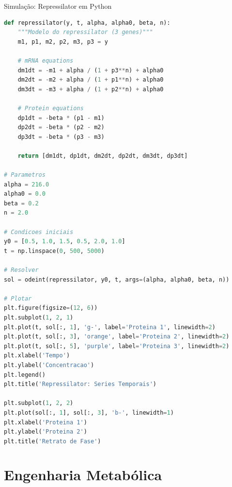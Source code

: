 \begin{frame}[fragile]{Simulação: Repressilator em Python}
\begin{lstlisting}[language=Python, caption=Modelo do repressilator, basicstyle=\ttfamily\tiny]
def repressilator(y, t, alpha, alpha0, beta, n):
    """Modelo do repressilator (3 genes)"""
    m1, p1, m2, p2, m3, p3 = y

    # mRNA equations
    dm1dt = -m1 + alpha / (1 + p3**n) + alpha0
    dm2dt = -m2 + alpha / (1 + p1**n) + alpha0
    dm3dt = -m3 + alpha / (1 + p2**n) + alpha0

    # Protein equations
    dp1dt = -beta * (p1 - m1)
    dp2dt = -beta * (p2 - m2)
    dp3dt = -beta * (p3 - m3)

    return [dm1dt, dp1dt, dm2dt, dp2dt, dm3dt, dp3dt]

# Parametros
alpha = 216.0
alpha0 = 0.0
beta = 0.2
n = 2.0

# Condicoes iniciais
y0 = [0.5, 1.0, 1.5, 0.5, 2.0, 1.0]
t = np.linspace(0, 500, 5000)

# Resolver
sol = odeint(repressilator, y0, t, args=(alpha, alpha0, beta, n))

# Plotar
plt.figure(figsize=(12, 6))
plt.subplot(1, 2, 1)
plt.plot(t, sol[:, 1], 'g-', label='Proteina 1', linewidth=2)
plt.plot(t, sol[:, 3], 'orange', label='Proteina 2', linewidth=2)
plt.plot(t, sol[:, 5], 'purple', label='Proteina 3', linewidth=2)
plt.xlabel('Tempo')
plt.ylabel('Concentracao')
plt.legend()
plt.title('Repressilator: Series Temporais')

plt.subplot(1, 2, 2)
plt.plot(sol[:, 1], sol[:, 3], 'b-', linewidth=1)
plt.xlabel('Proteina 1')
plt.ylabel('Proteina 2')
plt.title('Retrato de Fase')
\end{lstlisting}
\end{frame}

\section{Engenharia Metabólica}

